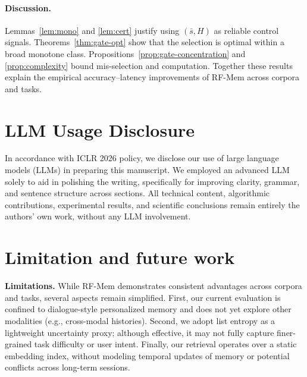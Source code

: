 \paragraph{Discussion.}
Lemmas~\ref{lem:mono} and \ref{lem:cert} justify using $(\bar{s},H)$ as reliable control signals.
Theorems~\ref{thm:gate-opt} show that the selection is optimal within a broad monotone class.
Propositions~\ref{prop:gate-concentration} and \ref{prop:complexity} bound mis-selection and computation.
Together these results explain the empirical accuracy–latency improvements of RF-Mem across corpora and tasks.


\section{LLM Usage Disclosure}

In accordance with ICLR 2026 policy, we disclose our use of large language models (LLMs) in preparing this manuscript. 
We employed an advanced LLM solely to aid in polishing the writing, specifically for improving clarity, grammar, and sentence structure across sections. 
All technical content, algorithmic contributions, experimental results, and scientific conclusions remain entirely the authors' own work, without any LLM involvement.

\section{Limitation and future work}
\textbf{Limitations.} While RF-Mem demonstrates consistent advantages across corpora and tasks, several aspects remain simplified. 
First, our current evaluation is confined to dialogue-style personalized memory and does not yet explore other modalities (e.g., cross-modal histories). 
Second, we adopt list entropy as a lightweight uncertainty proxy; although effective, it may not fully capture finer-grained task difficulty or user intent. 
Finally, our retrieval operates over a static embedding index, without modeling temporal updates of memory or potential conflicts across long-term sessions.



